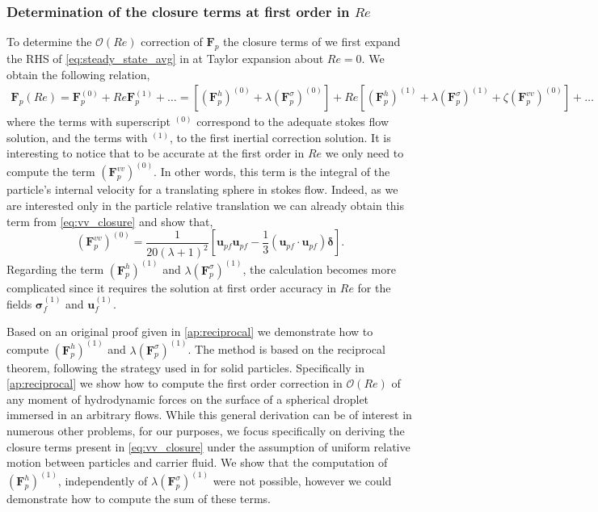 \subsubsection{Determination of the closure terms at first order in $Re$}

To determine the $\mathcal{O}(Re)$ correction of $\textbf{F}_p$ the closure terms of we first expand the RHS of \ref{eq:steady_state_avg} in at Taylor expansion about $Re = 0$. 
We obtain the following relation, 
\begin{align*}
    \textbf{F}_p(Re)
    = 
    \textbf{F}_p^{(0)}
    + Re\textbf{F}_p^{(1)}
    + \ldots 
    = 
    [(\textbf{F}^h_p)^{(0)}+\lambda (\textbf{F}^\sigma_p)^{(0)}]
    + Re[(\textbf{F}^h_p)^{(1)}+\lambda (\textbf{F}^\sigma_p)^{(1)}+\zeta (\textbf{F}^{vv}_p)^{(0)}]
    + \ldots 
\end{align*}
where the terms with superscript $^{(0)}$ correspond to the adequate stokes flow solution, and the terms with $^{(1)}$, to the first inertial correction solution. 
It is interesting to notice that to be accurate at the first order in $Re$ we only need to compute the term $(\textbf{F}^{vv}_p)^{(0)}$.
In other words, this term is the integral of the particle's internal velocity for a translating sphere in stokes flow.  
Indeed, as we are interested only in the particle relative translation we can already obtain this term from \ref{eq:vv_closure} and show that, 
\begin{equation}
    (\textbf{F}^{vv}_p)^{(0)}
    = \frac{1}{20(\lambda +1 )^2}
        [\textbf{u}_{p f}\textbf{u}_{p f} 
    -\frac{1}{3} (\textbf{u}_{p f}\cdot \textbf{u}_{p f})\bm\delta]. 
    \label{eq:closure_vv}
\end{equation}
Regarding the term $(\textbf{F}^h_p)^{(1)}$ and $\lambda (\textbf{F}^\sigma_p)^{(1)}$, the calculation becomes more complicated since it requires the solution at first order accuracy in $Re$ for the fields $\bm\sigma_f^{(1)}$ and $\textbf{u}_f^{(1)}$. 

Based on an original proof given in \ref{ap:reciprocal} we demonstrate how to compute $(\textbf{F}^h_p)^{(1)}$ and $\lambda (\textbf{F}^\sigma_p)^{(1)}$. 
The method is based on the reciprocal theorem, following the strategy used in \citet{stone2001inertial} for solid particles. 
Specifically in \ref{ap:reciprocal} we show how to compute the first order correction in $\mathcal{O}(Re)$ of any moment of hydrodynamic forces on the surface of a spherical droplet immersed in an arbitrary flows. 
While this general derivation can be of interest in numerous other problems, for our purposes, we focus specifically on deriving the closure terms present in \ref{eq:vv_closure} under the assumption of uniform relative motion between particles and carrier fluid. 
We show that the computation of $(\textbf{F}^h_p)^{(1)}$, independently of $\lambda (\textbf{F}^\sigma_p)^{(1)}$ were not possible, however we could demonstrate  how to compute the sum of these terms. 

